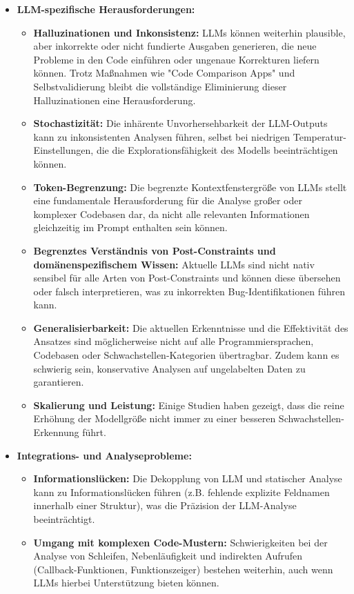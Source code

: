 \begin{itemize}
    \item \textbf{LLM-spezifische Herausforderungen:}
    \begin{itemize}
        \item \textbf{Halluzinationen und Inkonsistenz:} LLMs können weiterhin plausible, aber inkorrekte oder nicht fundierte Ausgaben generieren, die neue Probleme in den Code einführen oder ungenaue Korrekturen liefern können. Trotz Maßnahmen wie "Code Comparison Apps" und Selbstvalidierung bleibt die vollständige Eliminierung dieser Halluzinationen eine Herausforderung.
        \item \textbf{Stochastizität:} Die inhärente Unvorhersehbarkeit der LLM-Outputs kann zu inkonsistenten Analysen führen, selbst bei niedrigen Temperatur-Einstellungen, die die Explorationsfähigkeit des Modells beeinträchtigen können.
        \item \textbf{Token-Begrenzung:} Die begrenzte Kontextfenstergröße von LLMs stellt eine fundamentale Herausforderung für die Analyse großer oder komplexer Codebasen dar, da nicht alle relevanten Informationen gleichzeitig im Prompt enthalten sein können.
        \item \textbf{Begrenztes Verständnis von Post-Constraints und domänenspezifischem Wissen:} Aktuelle LLMs sind nicht nativ sensibel für alle Arten von Post-Constraints und können diese übersehen oder falsch interpretieren, was zu inkorrekten Bug-Identifikationen führen kann.
        \item \textbf{Generalisierbarkeit:} Die aktuellen Erkenntnisse und die Effektivität des Ansatzes sind möglicherweise nicht auf alle Programmiersprachen, Codebasen oder Schwachstellen-Kategorien übertragbar. Zudem kann es schwierig sein, konservative Analysen auf ungelabelten Daten zu garantieren.
        \item \textbf{Skalierung und Leistung:} Einige Studien haben gezeigt, dass die reine Erhöhung der Modellgröße nicht immer zu einer besseren Schwachstellen-Erkennung führt.
    \end{itemize}
    \item \textbf{Integrations- und Analyseprobleme:}
    \begin{itemize}
        \item \textbf{Informationslücken:} Die Dekopplung von LLM und statischer Analyse kann zu Informationslücken führen (z.B. fehlende explizite Feldnamen innerhalb einer Struktur), was die Präzision der LLM-Analyse beeinträchtigt.
        \item \textbf{Umgang mit komplexen Code-Mustern:} Schwierigkeiten bei der Analyse von Schleifen, Nebenläufigkeit und indirekten Aufrufen (Callback-Funktionen, Funktionszeiger) bestehen weiterhin, auch wenn LLMs hierbei Unterstützung bieten können.

\end{itemize}
\end{itemize}
